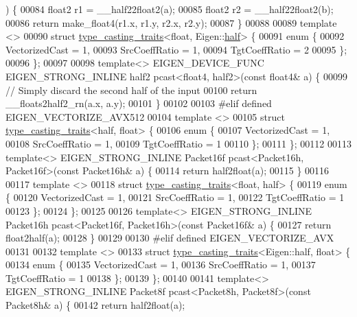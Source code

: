 \begin{DoxyCode}
      ) \{
00084   float2 r1 = \_\_half22float2(a);
00085   float2 r2 = \_\_half22float2(b);
00086   \textcolor{keywordflow}{return} make\_float4(r1.x, r1.y, r2.x, r2.y);
00087 \}
00088 
00089 \textcolor{keyword}{template} <>
00090 \textcolor{keyword}{struct }\hyperlink{struct_eigen_1_1internal_1_1type__casting__traits}{type\_casting\_traits}<float, Eigen::\hyperlink{struct_eigen_1_1half}{half}> \{
00091   \textcolor{keyword}{enum} \{
00092     VectorizedCast = 1,
00093     SrcCoeffRatio = 1,
00094     TgtCoeffRatio = 2
00095   \};
00096 \};
00097 
00098 \textcolor{keyword}{template}<> EIGEN\_DEVICE\_FUNC EIGEN\_STRONG\_INLINE half2 pcast<float4, half2>(\textcolor{keyword}{const} float4& a) \{
00099   \textcolor{comment}{// Simply discard the second half of the input}
00100   \textcolor{keywordflow}{return} \_\_floats2half2\_rn(a.x, a.y);
00101 \}
00102 
00103 \textcolor{preprocessor}{#elif defined EIGEN\_VECTORIZE\_AVX512}
00104 \textcolor{keyword}{template} <>
00105 \textcolor{keyword}{struct }\hyperlink{struct_eigen_1_1internal_1_1type__casting__traits}{type\_casting\_traits}<half, float> \{
00106   \textcolor{keyword}{enum} \{
00107     VectorizedCast = 1,
00108     SrcCoeffRatio = 1,
00109     TgtCoeffRatio = 1
00110   \};
00111 \};
00112 
00113 \textcolor{keyword}{template}<> EIGEN\_STRONG\_INLINE Packet16f pcast<Packet16h, Packet16f>(\textcolor{keyword}{const} Packet16h& a) \{
00114   \textcolor{keywordflow}{return} half2float(a);
00115 \}
00116 
00117 \textcolor{keyword}{template} <>
00118 \textcolor{keyword}{struct }\hyperlink{struct_eigen_1_1internal_1_1type__casting__traits}{type\_casting\_traits}<float, half> \{
00119   \textcolor{keyword}{enum} \{
00120     VectorizedCast = 1,
00121     SrcCoeffRatio = 1,
00122     TgtCoeffRatio = 1
00123   \};
00124 \};
00125 
00126 \textcolor{keyword}{template}<> EIGEN\_STRONG\_INLINE Packet16h pcast<Packet16f, Packet16h>(\textcolor{keyword}{const} Packet16f& a) \{
00127   \textcolor{keywordflow}{return} float2half(a);
00128 \}
00129 
00130 \textcolor{preprocessor}{#elif defined EIGEN\_VECTORIZE\_AVX}
00131 
00132 \textcolor{keyword}{template} <>
00133 \textcolor{keyword}{struct }\hyperlink{struct_eigen_1_1internal_1_1type__casting__traits}{type\_casting\_traits}<Eigen::half, float> \{
00134   \textcolor{keyword}{enum} \{
00135     VectorizedCast = 1,
00136     SrcCoeffRatio = 1,
00137     TgtCoeffRatio = 1
00138   \};
00139 \};
00140 
00141 \textcolor{keyword}{template}<> EIGEN\_STRONG\_INLINE Packet8f pcast<Packet8h, Packet8f>(\textcolor{keyword}{const} Packet8h& a) \{
00142   \textcolor{keywordflow}{return} half2float(a);

\end{DoxyCode}
